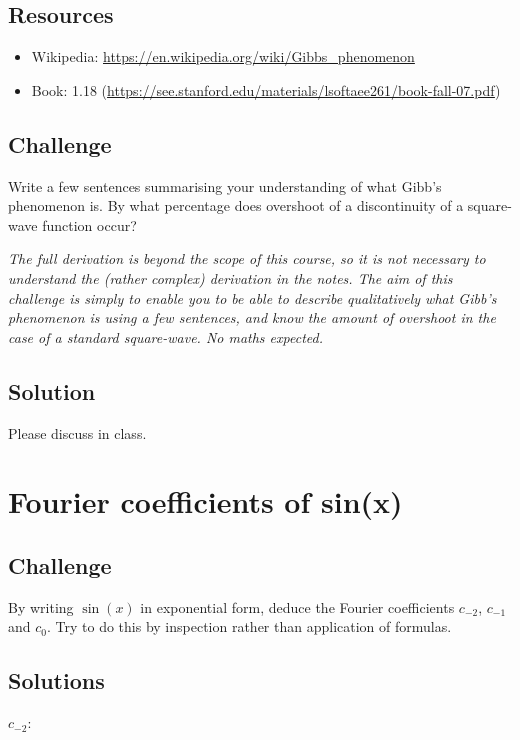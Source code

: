 \subsection*{Resources}
\begin{itemize}
    \item Wikipedia: \url{https://en.wikipedia.org/wiki/Gibbs_phenomenon}
    \item Book: 1.18 (\url{https://see.stanford.edu/materials/lsoftaee261/book-fall-07.pdf})
\end{itemize}

\subsection*{Challenge}
Write a few sentences summarising your understanding of what Gibb's phenomenon is. By what percentage does overshoot of a discontinuity of a square-wave function occur?

\emph{The full derivation is beyond the scope of this course, so it is not necessary to understand the (rather complex) derivation in the notes. The aim of this challenge is simply to enable you to be able to describe qualitatively what Gibb's phenomenon is using a few sentences, and know the amount of overshoot in the case of a standard square-wave. No maths expected.}

\subsection*{Solution}
Please discuss in class.




\newpage
\section{Fourier coefficients of sin(x)}
\label{sec:fcsinx}

\subsection*{Challenge}
By writing $\sin(x)$ in exponential form, deduce the Fourier coefficients $c_{-2}$, $c_{-1}$ and $c_0$. Try to do this by inspection rather than application of formulas.

\subsection*{Solutions}
$c_{-2}$:\\

